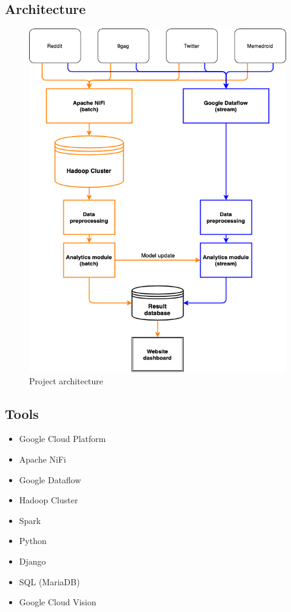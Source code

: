 \documentclass{article}
\begin{document}
\subsection{Architecture}

	\begin{figure}[!h]
	\centering
		\includegraphics[scale = 0.55]{architecture.png}
		\caption{Project architecture}
	\end{figure}

\newpage
\subsection{Tools}
\begin{itemize}
    \item Google Cloud Platform
    \item Apache NiFi
    \item Google Dataflow
    \item Hadoop Cluster
    \item Spark
    \item Python
    \item Django
    \item SQL (MariaDB)
    \item Google Cloud Vision

\end{itemize}
\end{document}

